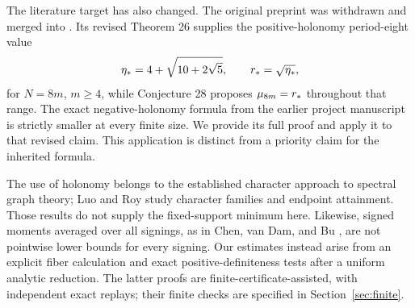 The literature target has also changed. The original preprint
\cite{Suvagiya2026old} was withdrawn and merged into
\cite{Suvagiya2026}. Its revised Theorem 26 supplies the positive-holonomy
period-eight value
\begin{equation}
 \eta_*=4+\sqrt{10+2\sqrt5},\qquad r_*=\sqrt{\eta_*},
 \label{eq:rstar}
\end{equation}
for $N=8m$, $m\ge4$, while Conjecture 28 proposes $\mu_{8m}=r_*$
throughout that range. The exact negative-holonomy formula from the earlier
project manuscript \cite{EarlierPeriodEight} is strictly smaller at every
finite size. We provide its full proof and apply it to that revised claim.
This application is distinct from a priority claim for the inherited formula.

The use of holonomy belongs to the established character approach to
spectral graph theory; Luo and Roy \cite[Theorems 3.6 and 3.13]{LuoRoy2026}
study character families and endpoint attainment. Those results do not
supply the fixed-support minimum here. Likewise, signed moments averaged
over all signings, as in Chen, van Dam, and Bu
\cite[Theorem 3.1]{ChenDamBu2024}, are not pointwise lower bounds for every
signing. Our estimates instead arise from an explicit fiber calculation
and exact positive-definiteness tests after a uniform analytic reduction.
The latter proofs are finite-certificate-assisted, with independent exact
replays; their finite checks are specified in Section~\ref{sec:finite}.
